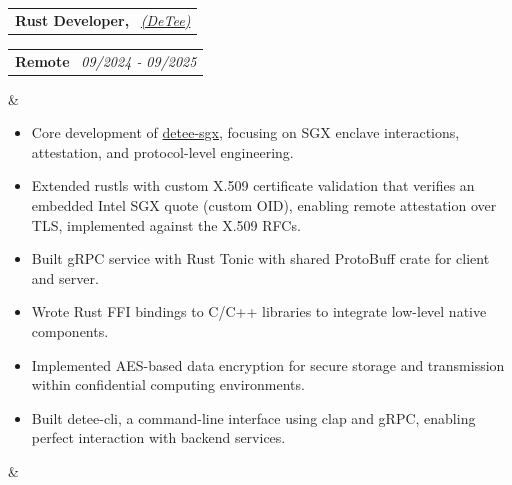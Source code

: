 \documentclass[11pt,a4paper,sans]{moderncv}
\makeatletter
\newcommand*{\customcventry}[7][0.13em]{
  \begin{tabular}{@{}l}
    {\bfseries #4} \
    {\itshape #3}
  \end{tabular}
  \hfill
  \begin{tabular}{l@{}}
    {\bfseries #5} \
    {\itshape #2}
  \end{tabular}
  \ifx&#7&
  \else{\
    \begin{minipage}{\maincolumnwidth}
      \small#7
  \end{minipage}}\fi
  \par\addvspace{#1}
}
\makeatother
\begin{document}
\customcventry{09/2024 ‐
09/2025}{{\color{blue}\href{https://detee.ltd/}{(DeTee)}}}{Rust Developer,}{Remote}{} {{
    \begin{itemize}[leftmargin=0.6cm, label={\textbullet}]
        \vspace{0.6em}
      \item Core development of {\color{blue}\href{https://gitea.detee.cloud/general/detee-sgx}{detee-sgx}}, focusing on SGX enclave interactions, attestation, and protocol-level engineering.
      \item Extended rustls with custom X.509 certificate validation that verifies an embedded Intel SGX quote (custom OID), enabling remote attestation over TLS, implemented against the X.509 RFCs.
      \item Built gRPC service with Rust Tonic with shared ProtoBuff crate for client and server.
      \item Wrote Rust FFI bindings to C/C++ libraries to integrate low-level native components.
      \item Implemented AES-based data encryption for secure storage and transmission within confidential computing environments.
      \item Built detee-cli, a command-line interface using clap and gRPC, enabling perfect interaction with backend services.
    \end{itemize}
}}

\clearpage
\end{document}
